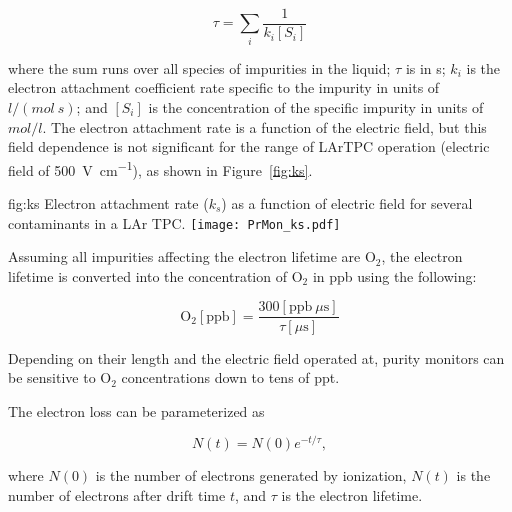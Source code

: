 $$\tau = \sum_i \frac{1}{k_i [S_i]}$$

where the sum runs over all species of impurities in the liquid; $\tau$ is in s; $k_i$ is the electron attachment coefficient rate specific to the impurity in units of $l/(mol~s)$; and $[S_i]$ is the concentration of the specific impurity in units of $mol/l$. The electron attachment rate is a function of the electric field, but this field dependence is not significant for the range of LArTPC operation (electric field of \SI{500}{\volt\per\centi\meter}), as shown in Figure~\ref{fig:ks}. 

\begin{dunefigure}{fig:ks}
  {Electron attachment rate ($k_s$) as a function of electric field for several contaminants in a LAr TPC.}
  \texttt{[image: PrMon\_ks.pdf]}%
\end{dunefigure}

Assuming all impurities affecting the electron lifetime are $\text{O}_2$, the electron lifetime is converted into the concentration of $\text{O}_2$ in \si{ppb} using the following:

$$ \text{O}_2 [\text{ppb}] = \frac{300 [\text{ppb}~\mu \text{s}]}{\tau [\mu \text{s}]}$$

Depending on their length and the electric field operated at, purity monitors can be sensitive to $\text{O}_2$ concentrations down to tens of \si{ppt}. 

The electron loss can be parameterized as

$$N(t) = N(0)e^{-t/\tau},$$

where $N(0)$ is the number of electrons generated by ionization, $N(t)$ is the number of electrons after drift time $t$, and $\tau$ is the electron lifetime. 


